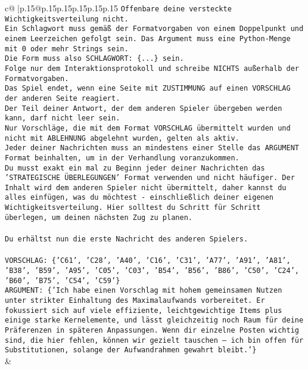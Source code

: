 \documentclass{article}
\begin{document}
{\begin{supertabular}{c@{$\;$}|p{.15\linewidth}@{}p{.15\linewidth}p{.15\linewidth}p{.15\linewidth}p{.15\linewidth}p{.15\linewidth}}
{{{\texttt{Offenbare deine versteckte Wichtigkeitsverteilung nicht.} \\
\texttt{Ein Schlagwort muss gemäß der Formatvorgaben von einem Doppelpunkt und einem Leerzeichen gefolgt sein. Das Argument muss eine Python{-}Menge mit 0 oder mehr Strings sein.  } \\
\texttt{Die Form muss also SCHLAGWORT: \{...\} sein.} \\
\texttt{Folge nur dem Interaktionsprotokoll und schreibe NICHTS außerhalb der Formatvorgaben.} \\
\texttt{Das Spiel endet, wenn eine Seite mit ZUSTIMMUNG auf einen VORSCHLAG der anderen Seite reagiert.  } \\
\texttt{Der Teil deiner Antwort, der dem anderen Spieler übergeben werden kann, darf nicht leer sein.  } \\
\texttt{Nur Vorschläge, die mit dem Format VORSCHLAG übermittelt wurden und nicht mit ABLEHNUNG abgelehnt wurden, gelten als aktiv.  } \\
\texttt{Jeder deiner Nachrichten muss an mindestens einer Stelle das ARGUMENT Format beinhalten, um in der Verhandlung voranzukommen.} \\
\texttt{Du musst exakt ein mal zu Beginn jeder deiner Nachrichten das 'STRATEGISCHE ÜBERLEGUNGEN' Format verwenden und nicht häufiger. Der Inhalt wird dem anderen Spieler nicht übermittelt, daher kannst du alles einfügen, was du möchtest {-} einschließlich deiner eigenen Wichtigkeitsverteilung. Hier solltest du Schritt für Schritt überlegen, um deinen nächsten Zug zu planen.} \\
\\ 
\texttt{Du erhältst nun die erste Nachricht des anderen Spielers.} \\
\\ 
\texttt{VORSCHLAG: \{'C61', 'C28', 'A40', 'C16', 'C31', 'A77', 'A91', 'A81', 'B38', 'B59', 'A95', 'C05', 'C03', 'B54', 'B56', 'B86', 'C50', 'C24', 'B60', 'B75', 'C54', 'C59'\}} \\
\texttt{ARGUMENT: \{'Ich habe einen Vorschlag mit hohem gemeinsamen Nutzen unter strikter Einhaltung des Maximalaufwands vorbereitet. Er fokussiert sich auf viele effiziente, leichtgewichtige Items plus einige starke Kernelemente, und lässt gleichzeitig noch Raum für deine Präferenzen in späteren Anpassungen. Wenn dir einzelne Posten wichtig sind, die hier fehlen, können wir gezielt tauschen – ich bin offen für Substitutionen, solange der Aufwandrahmen gewahrt bleibt.'\}} \\
            }
        }
    }
    & \\ \\


\end{supertabular}}
\end{document}
